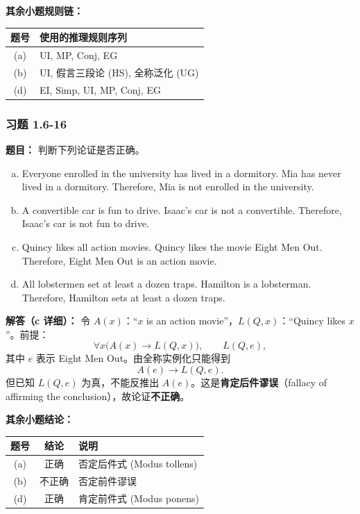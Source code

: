 \documentclass[11pt,UTF8]{article}
\begin{document}
\textbf{其余小题规则链：}
\begin{center}
\begin{tabular}{c|l}
\hline
题号 & 使用的推理规则序列 \\
\hline
(a) & UI, MP, Conj, EG \\
(b) & UI, 假言三段论 (HS), 全称泛化 (UG) \\
(d) & EI, Simp, UI, MP, Conj, EG \\
\hline
\end{tabular}
\end{center}

\subsubsection*{习题 1.6-16}
\textbf{题目：} 判断下列论证是否正确。
\begin{enumerate}[a)]
    \item Everyone enrolled in the university has lived in a dormitory. Mia has never lived in a dormitory. Therefore, Mia is not enrolled in the university.
    \item A convertible car is fun to drive. Isaac's car is not a convertible. Therefore, Isaac's car is not fun to drive.
    \item Quincy likes all action movies. Quincy likes the movie Eight Men Out. Therefore, Eight Men Out is an action movie.
    \item All lobstermen set at least a dozen traps. Hamilton is a lobsterman. Therefore, Hamilton sets at least a dozen traps.
\end{enumerate}

\textbf{解答（c 详细）：} 令 $A(x)$：``$x$ is an action movie''，$L(Q,x)$：``Quincy likes $x$''。前提：
\[ \forall x\bigl(A(x)\to L(Q,x)\bigr),\qquad L(Q,e), \]
其中 $e$ 表示 Eight Men Out。由全称实例化只能得到
\[ A(e)\to L(Q,e). \]
但已知 $L(Q,e)$ 为真，不能反推出 $A(e)$。这是\textbf{肯定后件谬误}（fallacy of affirming the conclusion），故论证\textbf{不正确}。

\textbf{其余小题结论：}
\begin{center}
\begin{tabular}{c|c|l}
\hline
题号 & 结论 & 说明 \\
\hline
(a) & 正确 & 否定后件式 (Modus tollens) \\
(b) & 不正确 & 否定前件谬误 \\
(d) & 正确 & 肯定前件式 (Modus ponens) \\
\hline
\end{tabular}
\end{center}
\end{document}
